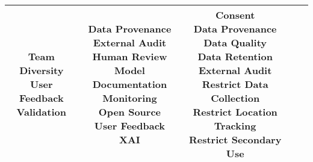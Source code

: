 \documentclass[fleqn]{article}
\begin{document}
\begin{landscape}
\begin{table}[H]
\begin{tabular}{|c|c|c|c|c|}
{			\textbullet\hspace{3pt} Team Diversity\\ 	
			\textbullet\hspace{3pt} User Feedback\\ 	
			\textbullet\hspace{3pt} Validation\\ 	
		}
		& \makecell[l]{
			\textbullet\hspace{3pt} Data Provenance\\ 
	 		\textbullet\hspace{3pt} External Audit\\ 		
			\textbullet\hspace{3pt} Human Review \\ 
			\textbullet\hspace{3pt} Model Documentation \\ 	
			\textbullet\hspace{3pt} Monitoring\\ 
			\textbullet\hspace{3pt} Open Source\\ 	
			\textbullet\hspace{3pt} User Feedback\\ 
			\textbullet\hspace{3pt} XAI \\
		}
		& \makecell[l]{
			\textbullet\hspace{3pt} Consent\\ 	
			\textbullet\hspace{3pt} Data Provenance\\ 	
			\textbullet\hspace{3pt} Data Quality\\ 	
			\textbullet\hspace{3pt} Data Retention\\ 	
			\textbullet\hspace{3pt} External Audit\\ 	
			\textbullet\hspace{3pt} Restrict Data Collection\\ 				
			\textbullet\hspace{3pt} Restrict Location Tracking\\ 		 
			\textbullet\hspace{3pt} Restrict Secondary Use\\ 			 
		}
		\\
		\hline
	\end{tabular}
	\label{table:med_risk_plan_by_tc}
\end{table}


\end{landscape}
\end{document}
